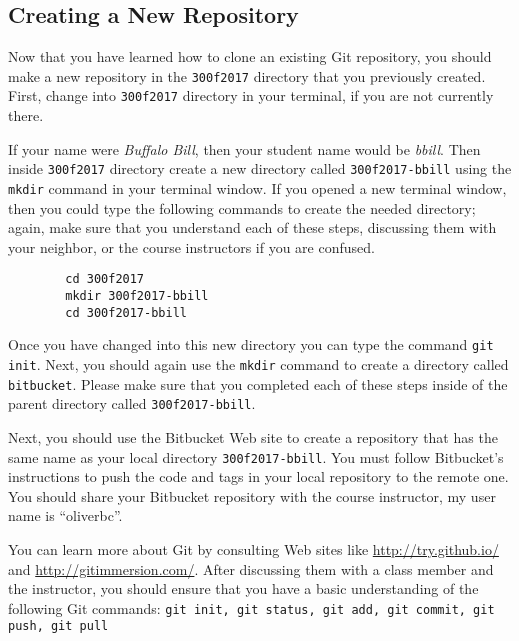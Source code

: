 \vspace*{-.2in}
\subsection*{Creating a New Repository}
\vspace*{-.1in}
Now that you have learned how to clone an existing Git repository, you should make a new repository in the {\tt 300f2017} directory that you previously created.  First, change into {\tt 300f2017} directory in your terminal, if you are not currently there. 

If your name were \emph{Buffalo Bill}, then your student name would be \emph{bbill}. Then inside {\tt 300f2017} directory create a new directory called {\tt 300f2017-bbill} using the {\tt mkdir} command in your terminal window. If you opened a new terminal window, then you could type the following commands to create the needed directory; again, make sure that you understand each of these steps, discussing them with your neighbor, or the course instructors if you are confused.

    \vspace*{-.15in}
    \begin{verbatim}
        cd 300f2017
        mkdir 300f2017-bbill
        cd 300f2017-bbill
    \end{verbatim}
    \vspace*{-.33in} 

\noindent Once you have changed into this new directory you can type the command {\tt git init}.  Next, you
should again use the {\tt mkdir} command to create a directory called {\tt bitbucket}.  Please make
sure that you completed each of these steps inside of the parent directory called {\tt 300f2017-bbill}.

\noindent Next, you should use the Bitbucket Web site to create a repository that has the same name as your local directory {\tt 300f2017-bbill}.  You must follow Bitbucket's instructions to push the code and tags in your local repository to the remote one. You should share your Bitbucket repository with the course instructor, my user name is ``oliverbc''.


\noindent You can learn more about Git by consulting Web sites like \url{http://try.github.io/} and \url{http://gitimmersion.com/}.  After discussing them with a class member and the instructor, you should ensure that you have a basic understanding of the following Git commands:
{\tt git init, git status, git add, git commit, git push, git pull} 



